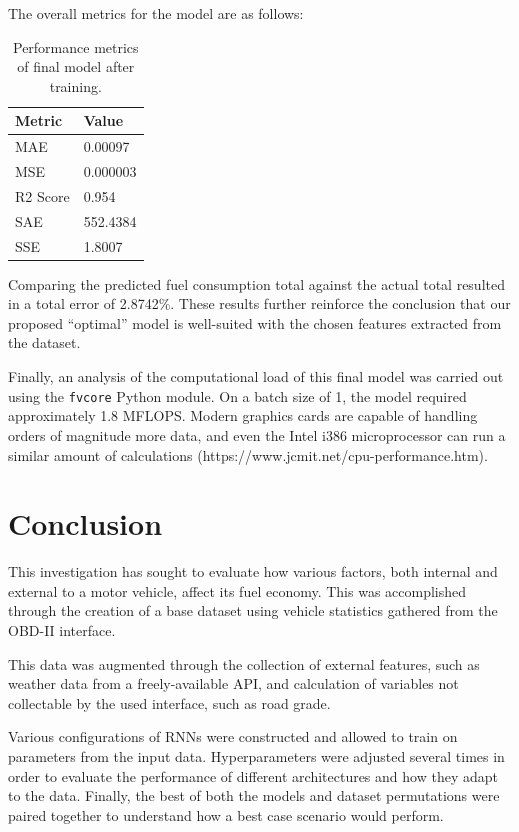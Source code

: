 \documentclass[letterpaper]{article}
\begin{document}
The overall metrics for the model are as follows:

\begin{table}[h!]
    \begin{tabular}{|l|l|}
        \hline
        Metric & Value \\
        \hline
        MAE          	& 0.00097	\\
        MSE          	& 0.000003   \\
        R2 Score     	& 0.954  	\\
        SAE          	& 552.4384   \\
        SSE          	& 1.8007 \\
        \hline
    \end{tabular}
    \caption{Performance metrics of final model after training.}
    \label{tab:my-table}
\end{table}

Comparing the predicted fuel consumption total against the actual total 
resulted in a total error of 2.8742\%. These results further reinforce the 
conclusion that our proposed ``optimal'' model is well-suited with the 
chosen features extracted from the dataset.

Finally, an analysis of the computational load of this final model was 
carried out using the \verb|fvcore| Python module. On a batch size of 1, 
the model required approximately 1.8 MFLOPS. Modern graphics cards are 
capable of handling orders of magnitude more data, and even the Intel 
i386 microprocessor can run a similar amount of calculations 
(https://www.jcmit.net/cpu-performance.htm).

\section{Conclusion}

This investigation has sought to evaluate how various factors, both 
internal and external to a motor vehicle, affect its fuel economy. This 
was accomplished through the creation of a base dataset using vehicle 
statistics gathered from the OBD-II interface.

This data was augmented through the collection of external features, 
such as weather data from a freely-available API, and calculation of 
variables not collectable by the used interface, such as road grade.

Various configurations of RNNs were constructed and allowed to train on 
parameters from the input data. Hyperparameters were adjusted several 
times in order to evaluate the performance of different architectures 
and how they adapt to the data. Finally, the best of both the models and 
dataset permutations were paired together to understand how a best case 
scenario would perform.
\end{document}
